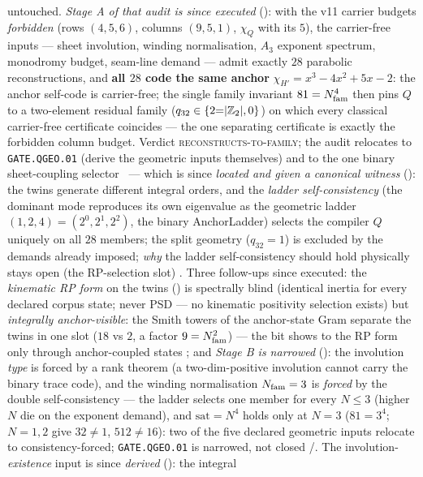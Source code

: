\begin{keybox}
untouched.  \emph{Stage A of that audit is since executed}
(): with the v11 carrier
budgets \emph{forbidden} (rows $(4,5,6)$, columns $(9,5,1)$, $\chi_Q$
with its $5$), the carrier-free inputs --- sheet involution, winding
normalisation, $A_3$ exponent spectrum, monodromy budget, seam-line
demand --- admit exactly $28$ parabolic reconstructions, and \textbf{all
$28$ code the same anchor} $\chi_{H'}=x^3-4x^2+5x-2$: the anchor
self-code is carrier-free; the single family invariant $81=N_{\mathrm{fam}}^4$ then
pins $Q$ to a two-element residual family ($q_{32}\in\{2{=}|\mathbb{Z}_2|,0\}$)
on which every classical carrier-free certificate coincides --- the one
separating certificate is exactly the forbidden column budget.  Verdict
\textsc{reconstructs-to-family}; the audit relocates to
\texttt{GATE.QGEO.01} (derive the geometric inputs themselves) and to
the one binary sheet-coupling selector \mO\ --- which is since
\emph{located and given a canonical witness}
(): the twins generate different
integral orders, and the \emph{ladder self-consistency} (the dominant
mode reproduces its own eigenvalue as the geometric ladder
$(1,2,4)=(2^0,2^1,2^2)$, the binary AnchorLadder) selects the compiler
$Q$ uniquely on all $28$ members; the split geometry ($q_{32}=1$) is
excluded by the demands already imposed; \emph{why} the ladder
self-consistency should hold physically stays open (the RP-selection
slot) \mO.  Three follow-ups since executed: the \emph{kinematic RP form}
on the twins () is spectrally blind
(identical inertia for every declared corpus state; never PSD --- no
kinematic positivity selection exists) but \emph{integrally
anchor-visible}: the Smith towers of the anchor-state Gram separate the
twins in one slot ($18$ vs $2$, a factor $9=N_{\mathrm{fam}}^2$) --- the bit shows
to the RP form only through anchor-coupled states \mE; and \emph{Stage B
is narrowed} (): the involution
\emph{type} is forced by a rank theorem (a two-dim-positive involution
cannot carry the binary trace code), and the winding normalisation
$N_{\mathrm{fam}}=3$ is \emph{forced} by the double self-consistency --- the ladder
selects one member for every $N\le3$ (higher $N$ die on the exponent
demand), and $\mathrm{sat}=N^4$ holds only at $N=3$ ($81=3^4$; $N=1,2$
give $32\neq1$, $512\neq16$): two of the five declared geometric inputs
relocate to consistency-forced; \texttt{GATE.QGEO.01} is narrowed, not
closed \mE/\mC.  The involution-\emph{existence} input is since
\emph{derived} (): the integral

\end{keybox}
